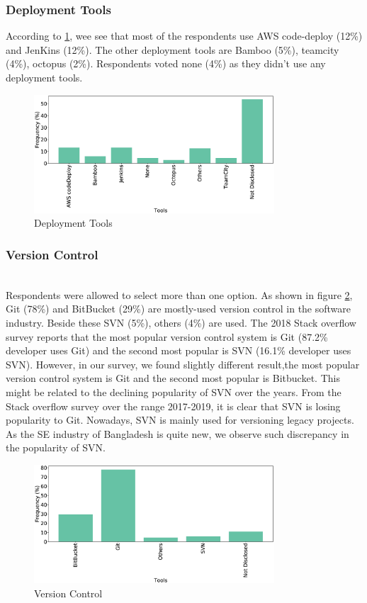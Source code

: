 \subsubsection{Deployment Tools}
According to \cref{fig:deployTools}, wee see that most of the respondents use AWS code-deploy (12\%) and JenKins (12\%). The other deployment tools are Bamboo (5\%), teamcity (4\%), octopus (2\%). Respondents voted none (4\%) as they didn’t use any deployment tools.
\begin{figure}[htbp]
\centering
  \includegraphics[width=0.8\textwidth]{Figures/Respondents_deployment_tools}
  \caption{Deployment Tools}
  \label{fig:deployTools}
\end{figure}

\subsubsection{Version Control}
\hfill\\
Respondents were allowed to select more than one option. As shown in figure \ref{fig:versionControl}, Git (78\%) and BitBucket (29\%) are mostly-used version control in the software industry. Beside these SVN (5\%), others (4\%) are used.  The 2018 Stack overflow survey\citep{StackoverflowSurvey2018} reports that  the most popular version control system is Git (87.2\% developer uses Git) and the second most popular is SVN (16.1\% developer uses SVN). However, in our survey, we found slightly different result,the most popular version control system is Git and the second most popular is Bitbucket. This might be related  to the declining popularity of SVN over the years. From the Stack overflow survey over the range 2017-2019, it is clear that SVN is losing popularity to Git. Nowadays, SVN is mainly used for versioning legacy projects. As the SE industry of Bangladesh is quite new, we observe such discrepancy in the popularity of SVN.

\begin{figure}[htbp]
\centering
  \includegraphics[width=0.8\textwidth]{Figures/Respondents_version_control}
  \caption{Version Control}
  \label{fig:versionControl}
\end{figure}